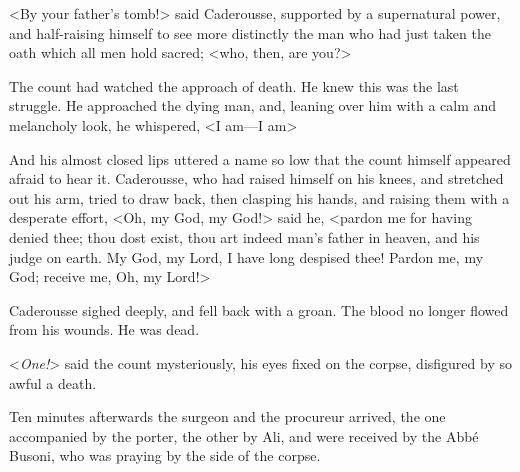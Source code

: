  <By your father's tomb!> said Caderousse, supported by a supernatural power, and half-raising himself to see more distinctly the man who had just taken the oath which all men hold sacred; <who, then, are you?> 

 The count had watched the approach of death. He knew this was the last struggle. He approached the dying man, and, leaning over him with a calm and melancholy look, he whispered, <I am—I am\longdash> 

 And his almost closed lips uttered a name so low that the count himself appeared afraid to hear it. Caderousse, who had raised himself on his knees, and stretched out his arm, tried to draw back, then clasping his hands, and raising them with a desperate effort, <Oh, my God, my God!> said he, <pardon me for having denied thee; thou dost exist, thou art indeed man's father in heaven, and his judge on earth. My God, my Lord, I have long despised thee! Pardon me, my God; receive me, Oh, my Lord!> 

 Caderousse sighed deeply, and fell back with a groan. The blood no longer flowed from his wounds. He was dead. 

 <\textit{One!}> said the count mysteriously, his eyes fixed on the corpse, disfigured by so awful a death. 

 Ten minutes afterwards the surgeon and the procureur arrived, the one accompanied by the porter, the other by Ali, and were received by the Abbé Busoni, who was praying by the side of the corpse. 